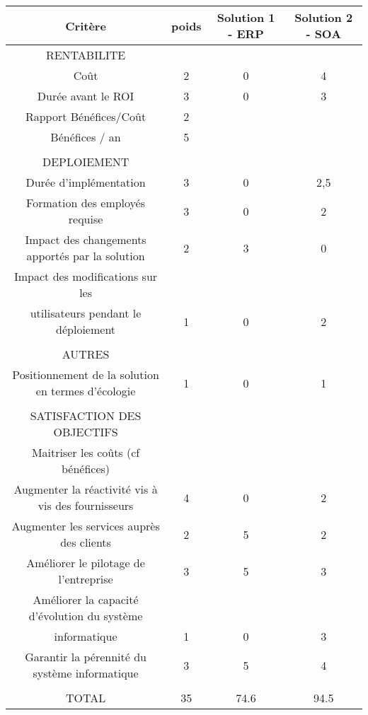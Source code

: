 \begin{tabular}{|c|c|c|c|} 
\hline
\rowcolor{EnTete} Critère & poids & Solution 1 - ERP & Solution 2 - SOA \\ \hline
\rowcolor{Activite} RENTABILITE &  &  & \\ \hline
Coût & 2 & 0 & 4 \\ \hline
Durée avant le ROI & 3 & 0 & 3 \\ \hline
Rapport Bénéfices/Coût & 2 &  &  \\ \hline
Bénéfices / an & 5 &  &  \\ \hline
 &  &  &  \\ \hline
\rowcolor{Activite} DEPLOIEMENT &  &  &  \\ \hline
Durée d'implémentation & 3 & 0 & 2,5  \\ \hline
Formation des employés requise & 3 & 0 & 2 \\ \hline
Impact des changements apportés par la solution & 2 & 3 & 0 \\ \hline
Impact des modifications sur les &  &  &  \\
utilisateurs pendant le déploiement & 1 & 0 & 2 \\ \hline
 &  &  &  \\ \hline
\rowcolor{Activite} AUTRES &  &  &  \\ \hline
Positionnement de la solution en termes d'écologie & 1 & 0 & 1 \\ \hline
 &  &  &  \\ \hline
\rowcolor{Activite} SATISFACTION DES OBJECTIFS &  &  & \\ \hline 
Maitriser les coûts (cf bénéfices) &  &  & \\ \hline
Augmenter la réactivité vis à vis des fournisseurs & 4 & 0 & 2 \\ \hline
 Augmenter les services auprès des clients & 2 & 5 & 2 \\ \hline
Améliorer le pilotage de l’entreprise & 3 & 5 & 3 \\ \hline
Améliorer la capacité d’évolution du système  &  &  &  \\
informatique & 1 & 0 & 3 \\ \hline 
Garantir la pérennité du système informatique & 3 & 5 & 4 \\ \hline
 &  &  &  \\ \hline
\rowcolor{Total}TOTAL & 35 & 74.6 & 94.5 \\ \hline

\end{tabular}